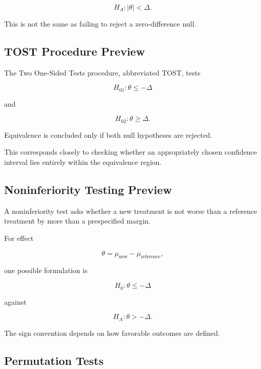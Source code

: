 \[
\boxed{
H_A:
|\theta|<\Delta.
}
\]

This is not the same as failing to reject a zero-difference null.

\subsection{TOST Procedure Preview}
\label{subsec:tost-preview}

The Two One-Sided Tests procedure, abbreviated TOST, tests

\[
H_{01}:
\theta\leq-\Delta
\]

and

\[
H_{02}:
\theta\geq\Delta.
\]

Equivalence is concluded only if both null hypotheses are rejected.

This corresponds closely to checking whether an appropriately chosen
confidence interval lies entirely within the equivalence region.

\subsection{Noninferiority Testing Preview}
\label{subsec:noninferiority-preview}

A noninferiority test asks whether a new treatment is not worse than a
reference treatment by more than a prespecified margin.

For effect

\[
\theta
=
\mu_{\text{new}}
-
\mu_{\text{reference}},
\]

one possible formulation is

\[
H_0:
\theta\leq-\Delta
\]

against

\[
H_A:
\theta>-\Delta.
\]

The sign convention depends on how favorable outcomes are defined.

\subsection{Permutation Tests}
\label{subsec:permutation-tests}

